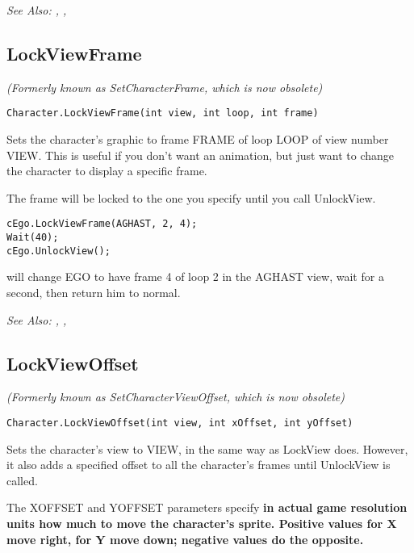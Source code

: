 \it{See Also:} ,
,


\subsection{LockViewFrame}\label{Character.LockViewFrame}%

\it{(Formerly known as SetCharacterFrame, which is now obsolete)}

\begin{verbatim}
Character.LockViewFrame(int view, int loop, int frame)
\end{verbatim}
Sets the character's graphic to frame FRAME of loop LOOP of view number VIEW.
This is useful if you don't want an animation, but just want to change the
character to display a specific frame.

The frame will be locked to the one you specify until you call UnlockView.

\begin{verbatim}
cEgo.LockViewFrame(AGHAST, 2, 4);
Wait(40);
cEgo.UnlockView();
\end{verbatim}
will change EGO to have frame 4 of loop 2 in the AGHAST view, wait for a second,
then return him to normal.

\it{See Also:} ,
,


\subsection{LockViewOffset}\label{Character.LockViewOffset}%

\it{(Formerly known as SetCharacterViewOffset, which is now obsolete)}

\begin{verbatim}
Character.LockViewOffset(int view, int xOffset, int yOffset)
\end{verbatim}

Sets the character's view to VIEW, in the same way as LockView does. However,
it also adds a specified offset to all the character's frames until UnlockView
is called.

The XOFFSET and YOFFSET parameters specify \bf{in actual game resolution units} how much
to move the character's sprite. Positive values for X move right, for Y move down; negative
values do the opposite.

